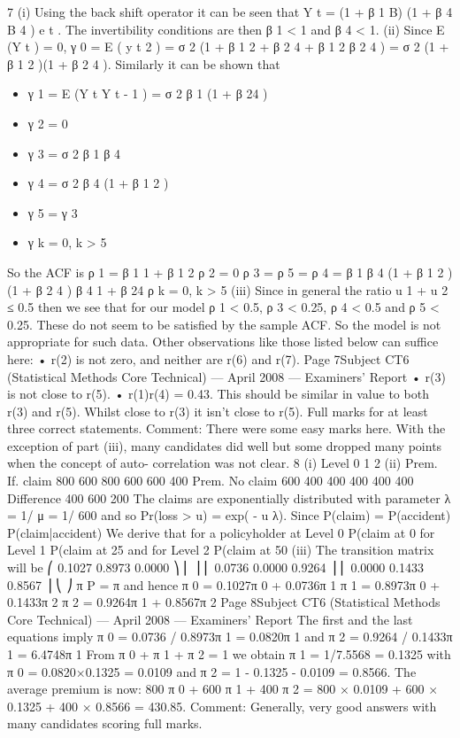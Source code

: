 \documentclass[a4paper,12pt]{article}
\begin{document}
7
(i)
Using the back shift operator it can be seen that
Y t = (1 + β 1 B) (1 + β 4 B 4 ) e t .
The invertibility conditions are then β 1 < 1 and β 4 < 1.
(ii)
Since E (Y t ) = 0, γ 0 = E ( y t 2 ) = σ 2 (1 + β 1 2 + β 2 4 + β 1 2 β 2 4 ) = σ 2 (1 + β 1 2 )(1 + β 2 4 ).
Similarly it can be shown that
\begin{itemize}
\item γ 1 = E (Y t Y t - 1 ) = σ 2 β 1 (1 + β 24 )
\item γ 2 = 0
\item γ 3 = σ 2 β 1 β 4
\item γ 4 = σ 2 β 4 (1 + β 1 2 )
\item γ 5 = γ 3
\item γ k = 0, k > 5
\end{itemize}
So the ACF is
ρ 1 =
β 1
1 + β 1 2
ρ 2 = 0
ρ 3 = ρ 5 =
ρ 4 =
β 1 β 4
(1 + β 1 2 )(1 + β 2 4 )
β 4
1 + β 24
ρ k = 0, k > 5
(iii)
Since in general the ratio
u
1 + u 2
≤ 0.5 then we see that for our model
ρ 1 < 0.5, ρ 3 < 0.25, ρ 4 < 0.5 and ρ 5 < 0.25. These do not seem to be
satisfied by the sample ACF. So the model is not appropriate for such data.
Other observations like those listed below can suffice here:
•
r(2) is not zero, and neither are r(6) and r(7).
Page 7Subject CT6 (Statistical Methods Core Technical) — April 2008 — Examiners’ Report
• r(3) is not close to r(5).
• r(1)r(4) = 0.43. This should be similar in value to both r(3) and r(5).
Whilst close to r(3) it isn't close to r(5).
Full marks for at least three correct statements.
Comment: There were some easy marks here. With the exception of part (iii), many
candidates did well but some dropped many points when the concept of auto-
correlation was not clear.
8
(i)
Level
0
1
2
(ii)
Prem. If. claim
800 600
800 600
600 400
Prem. No claim
600 400
400 400
400 400
Difference
400
600
200
The claims are exponentially distributed with parameter λ = 1/ μ = 1/ 600 and
so Pr(loss > u) = exp( - u λ).
Since
P(claim) = P(accident) P(claim|accident)
We derive that for a policyholder at Level 0
P(claim at 0%
for Level 1
P(claim at 25%
and for Level 2
P(claim at 50%
(iii)
The transition matrix will be
⎛ 0.1027 0.8973 0.0000 ⎞
⎜
⎟
⎜ 0.0736 0.0000 0.9264 ⎟
⎜ 0.0000 0.1433 0.8567 ⎟
⎝
⎠
π P = π and hence
π 0 = 0.1027π 0 + 0.0736π 1
π 1 = 0.8973π 0 + 0.1433π 2
π 2 = 0.9264π 1 + 0.8567π 2
Page 8Subject CT6 (Statistical Methods Core Technical) — April 2008 — Examiners’ Report
The first and the last equations imply
π 0 = 0.0736 / 0.8973π 1 = 0.0820π 1
and
π 2 = 0.9264 / 0.1433π 1 = 6.4748π 1
From π 0 + π 1 + π 2 = 1 we obtain π 1 = 1/7.5568 = 0.1325
with π 0 = 0.0820×0.1325 = 0.0109 and π 2 = 1 - 0.1325 - 0.0109 = 0.8566.
The average premium is now:
800 π 0 + 600 π 1 + 400 π 2 = 800 × 0.0109 + 600 × 0.1325 + 400 × 0.8566 =
430.85.
Comment: Generally, very good answers with many candidates scoring full marks.
\end{document}
